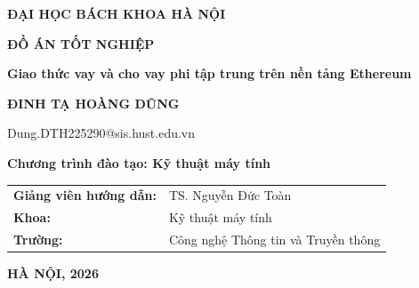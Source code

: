 \documentclass[DoAn.tex]{subfiles}
\begin{document}
\begin{titlepage}
\thispagestyle{empty}
\begin{center}
{\textbf{\large ĐẠI HỌC BÁCH KHOA HÀ NỘI}\par}

\vspace*{3cm}

{\textbf{\huge ĐỒ ÁN TỐT NGHIỆP}\par}
\vspace{1cm}
{\textbf{\Large Giao thức vay và cho vay phi tập trung trên nền tảng Ethereum}\par}
\vspace{1cm}

{\textbf{\large ĐINH TẠ HOÀNG DŨNG}\par}
{\large Dung.DTH225290@sis.hust.edu.vn\par}
\vspace{0.5cm}
{\textbf{\large Chương trình đào tạo: Kỹ thuật máy tính}\par}
\end{center}

\vfill

\noindent
\begin{tabular}{@{}p{}p{}@{}}
\textbf{Giảng viên hướng dẫn:} & TS. Nguyễn Đức Toàn \\[0.5cm]
\textbf{Khoa:} & Kỹ thuật máy tính \\[0.5cm]
\textbf{Trường:} & Công nghệ Thông tin và Truyền thông \\
\end{tabular}

\vfill

\begin{center}
\textbf{HÀ NỘI, 2026}
\end{center}

\end{titlepage}
\end{document}
